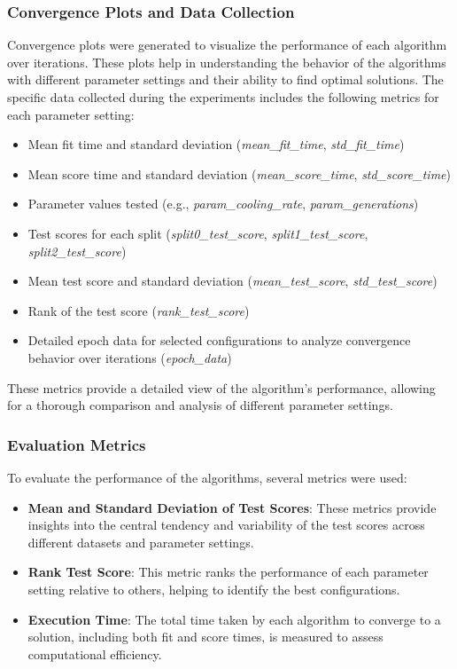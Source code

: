\documentclass[
]{article}
\begin{document}
    \subsubsection{Convergence Plots and Data Collection}

    Convergence plots were generated to visualize the performance of each algorithm over iterations. These plots help in understanding the behavior of the algorithms with different parameter settings and their ability to find optimal solutions. The specific data collected during the experiments includes the following metrics for each parameter setting:

    \begin{itemize}
        \item Mean fit time and standard deviation (\textit{mean\_fit\_time}, \textit{std\_fit\_time})
        \item Mean score time and standard deviation (\textit{mean\_score\_time}, \textit{std\_score\_time})
        \item Parameter values tested (e.g., \textit{param\_cooling\_rate}, \textit{param\_generations})
        \item Test scores for each split (\textit{split0\_test\_score}, \textit{split1\_test\_score}, \textit{split2\_test\_score})
        \item Mean test score and standard deviation (\textit{mean\_test\_score}, \textit{std\_test\_score})
        \item Rank of the test score (\textit{rank\_test\_score})
        \item Detailed epoch data for selected configurations to analyze convergence behavior over iterations (\textit{epoch\_data})
    \end{itemize}

    These metrics provide a detailed view of the algorithm's performance, allowing for a thorough comparison and analysis of different parameter settings.

    \subsubsection{Evaluation Metrics}

    To evaluate the performance of the algorithms, several metrics were used:

    \begin{itemize}
        \item \textbf{Mean and Standard Deviation of Test Scores}: These metrics provide insights into the central tendency and variability of the test scores across different datasets and parameter settings.
        \item \textbf{Rank Test Score}: This metric ranks the performance of each parameter setting relative to others, helping to identify the best configurations.
        \item \textbf{Execution Time}: The total time taken by each algorithm to converge to a solution, including both fit and score times, is measured to assess computational efficiency.
    \end{itemize}
\end{document}
